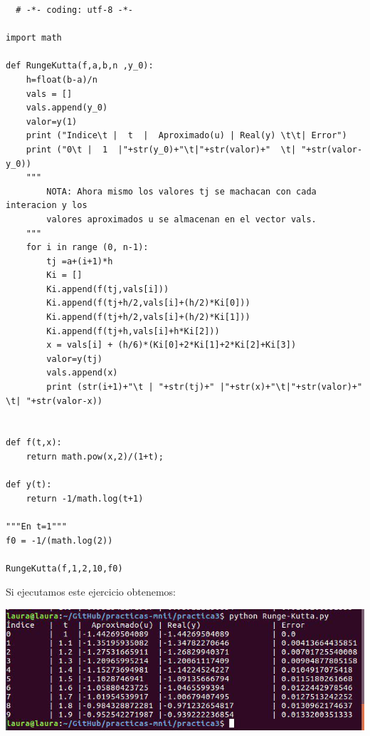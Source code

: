 \documentclass[11pt]{article}
\begin{document}
\begin{lstlisting}
  # -*- coding: utf-8 -*-

import math

def RungeKutta(f,a,b,n ,y_0):
    h=float(b-a)/n
    vals = []
    vals.append(y_0)
    valor=y(1)
    print ("Indice\t |  t  |  Aproximado(u) | Real(y) \t\t| Error")
    print ("0\t |  1  |"+str(y_0)+"\t|"+str(valor)+"  \t| "+str(valor-y_0))
    """
        NOTA: Ahora mismo los valores tj se machacan con cada interacion y los
        valores aproximados u se almacenan en el vector vals.
    """
    for i in range (0, n-1):
        tj =a+(i+1)*h
        Ki = []
        Ki.append(f(tj,vals[i]))
        Ki.append(f(tj+h/2,vals[i]+(h/2)*Ki[0]))
        Ki.append(f(tj+h/2,vals[i]+(h/2)*Ki[1]))
        Ki.append(f(tj+h,vals[i]+h*Ki[2]))
        x = vals[i] + (h/6)*(Ki[0]+2*Ki[1]+2*Ki[2]+Ki[3])
        valor=y(tj)
        vals.append(x)
        print (str(i+1)+"\t | "+str(tj)+" |"+str(x)+"\t|"+str(valor)+"  \t| "+str(valor-x))


def f(t,x):
    return math.pow(x,2)/(1+t);

def y(t):
    return -1/math.log(t+1)

"""En t=1"""
f0 = -1/(math.log(2))

RungeKutta(f,1,2,10,f0)
  \end{lstlisting}
  
  
  Si ejecutamos este ejercicio obtenemos:
  \begin{center}
	\includegraphics[scale=0.8]{kutta.jpg}
\end{center}
\end{document}

